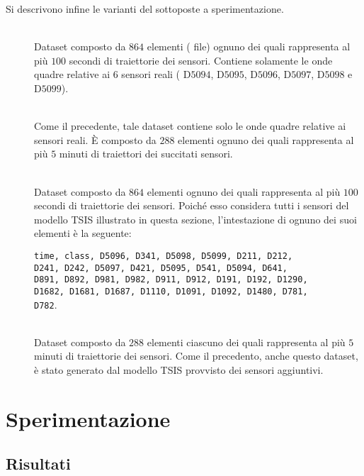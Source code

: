 Si descrivono infine le varianti del  sottoposte a sperimentazione.
\begin{description}
	\item[] \hfill \\
	Dataset composto da $864$ elementi (\ie{} file) ognuno dei quali rappresenta al più $100$ secondi di traiettorie dei sensori. Contiene solamente le onde quadre relative ai $6$ sensori reali (\ie{} D$5094$, D$5095$, D$5096$, D$5097$, D$5098$ e D$5099$).
	\item[] \hfill \\
	Come il precedente, tale dataset contiene solo le onde quadre relative ai sensori reali. \`E composto da $288$ elementi ognuno dei quali rappresenta al più $5$ minuti di traiettori dei succitati sensori.
	\item[] \hfill \\
	Dataset composto da $864$ elementi ognuno dei quali rappresenta al più $100$ secondi di traiettorie dei sensori. Poiché esso considera tutti i sensori del modello \acs{TSIS} illustrato in questa sezione, l'intestazione di ognuno dei suoi elementi è la seguente:\par
	\lstinline[]|time, class, D5096, D341, D5098, D5099, D211, D212, |\\\lstinline[]|D241, D242, D5097, D421, D5095, D541, D5094, D641, |\\\lstinline[]|D891, D892, D981, D982, D911, D912, D191, D192, D1290, |\\\lstinline[]|D1682, D1681, D1687, D1110, D1091, D1092, D1480, D781, |\\\lstinline[]|D782|.
	\item[] \hfill \\
	Dataset composto da $288$ elementi ciascuno dei quali rappresenta al più $5$ minuti di traiettorie dei sensori. Come il precedento, anche questo dataset, è stato generato dal modello \acs{TSIS} provvisto dei sensori aggiuntivi.
\end{description}

\section{Sperimentazione}

\subsection{Risultati}

